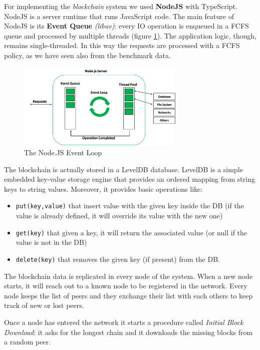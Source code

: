 \documentclass[11pt]{scrartcl} %
\begin{document}
For implementing the \textit{blockchain} system we used \textbf{NodeJS} with TypeScript. NodeJS is a server runtime that runs JavaScript code. The main feature of NodeJS is its \textbf{Event Queue} \textit{(libuv)}: every IO operation is enqueued in a FCFS queue and processed by multiple threads (figure \ref{fig:eventloop}). The application logic, though, remains single-threaded. In this way the requests are processed with a FCFS policy, as we have seen also from the benchmark data.

\begin{figure}[h]
\includegraphics[width=8cm]{Images/eventloop.png}
\centering
\caption{The Node.JS Event Loop}
\label{fig:eventloop}
\end{figure}


The blockchain is actually stored in a LevelDB database. LevelDB is a simple embedded key-value storage engine that provides an ordered mapping from string keys to string values. Moreover, it provides basic operations like:
\begin{itemize}
\item[\adforn{43}] \texttt{put(key,value)} that insert value with the given key inside the DB (if the value is already defined, it will override its value with the new one)
\item[\adforn{43}] \texttt{get(key)} that given a key, it will return the associated value (or null if the value is not in the DB)
\item[\adforn{43}] \texttt{delete(key)} that removes the given key (if present) from the DB.
\end{itemize}

The blockchain data is replicated in every node of the system. When a new node starts, it will reach out to a known node to be registered in the network. Every node keeps the list of peers and they exchange their list with each others to keep track of new or lost peers.

Once a node has entered the network it starts a procedure called \textit{Initial Block Download}: it asks for the longest chain and it downloads the missing blocks from a random peer.
\end{document}
